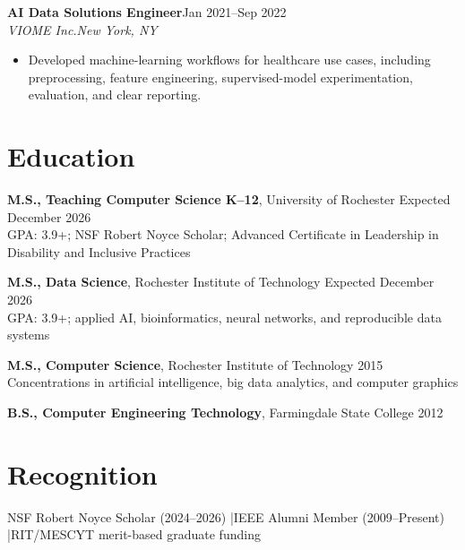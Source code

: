 \documentclass[10pt,letterpaper]{article}
\newcommand{\role}[4]{%
  \textbf{#1}\hfill #2\\
  \textit{#3}\hfill \textit{#4}\vspace{-3pt}
}
\begin{document}
\role{AI Data Solutions Engineer}{Jan 2021--Sep 2022}
{VIOME Inc.}{New York, NY}
\begin{itemize}
  \item Developed machine-learning workflows for healthcare use cases,
    including preprocessing, feature engineering, supervised-model
    experimentation, evaluation, and clear reporting.
\end{itemize}

\section*{Education}
\textbf{M.S., Teaching Computer Science K--12}, University of Rochester
\hfill Expected December 2026\\
GPA: 3.9+; NSF Robert Noyce Scholar; Advanced Certificate in Leadership in
Disability and Inclusive Practices

\textbf{M.S., Data Science}, Rochester Institute of Technology
\hfill Expected December 2026\\
GPA: 3.9+; applied AI, bioinformatics, neural networks, and reproducible data systems

\textbf{M.S., Computer Science}, Rochester Institute of Technology
\hfill 2015\\
Concentrations in artificial intelligence, big data analytics, and computer graphics

\textbf{B.S., Computer Engineering Technology}, Farmingdale State College
\hfill 2012

\section*{Recognition}
NSF Robert Noyce Scholar (2024--2026)
\enspace|\enspace IEEE Alumni Member (2009--Present)
\enspace|\enspace RIT/MESCYT merit-based graduate funding
\end{document}
